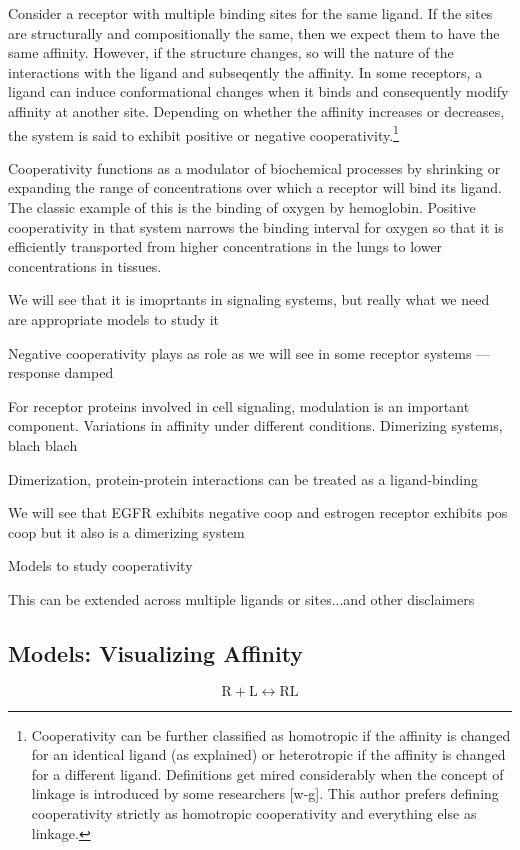 \documentclass{article}
\numberwithin{equation}{section}
\begin{document}
Consider a receptor with multiple binding sites for the same ligand. If the sites are structurally and compositionally the same, then we expect them to have the same affinity. However, if the structure changes, so will the nature of the interactions with the ligand and subseqently the affinity. In some receptors, a ligand can induce conformational changes when it binds and consequently modify affinity at another site. Depending on whether the affinity increases or decreases, the system is said to exhibit positive or negative cooperativity.\footnote{Cooperativity can be further classified as homotropic if the affinity is changed for an identical ligand (as explained) or heterotropic if the affinity is changed for a different ligand. Definitions get mired considerably when the concept of linkage is introduced by some researchers [w-g]. This author prefers defining cooperativity strictly as homotropic cooperativity and everything else as linkage.} 

Cooperativity functions as a modulator of biochemical processes by shrinking or expanding the range of concentrations over which a receptor will bind its ligand. The classic example of this is the binding of oxygen by hemoglobin. Positive cooperativity in that system narrows the binding interval for oxygen so that it is efficiently transported from higher concentrations in the lungs to lower concentrations in tissues.

We will see that it is imoprtants in signaling systems, but really what we need are appropriate models to study it



Negative cooperativity plays as role as we will see in some receptor systems --- response damped


For receptor proteins involved in cell signaling, modulation is an important component. Variations in affinity under different conditions. Dimerizing systems, blach blach

Dimerization, protein-protein interactions can be treated as a ligand-binding

We will see that EGFR exhibits negative coop and estrogen receptor exhibits pos coop but it also is a dimerizing system

Models to study cooperativity

This can be extended across multiple ligands or sites...and other disclaimers

\subsection*{Models: Visualizing Affinity}

\begin{equation}
	\text{R} + \text{L} \leftrightarrow \text{RL}
	\end{equation}
 
\end{document}
